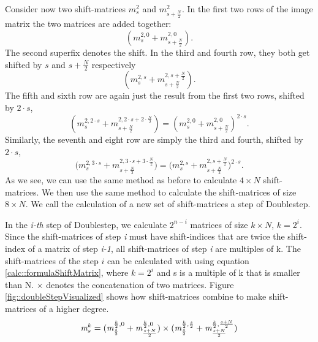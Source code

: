 \documentclass[12pt]{article}
\begin{document}
Consider now two shift-matrices $m_s^2$ and $m_{s+\frac{N}{2}}^2$. In the first two rows of the image matrix the two matrices are added together:
\[
(m_s^{2,0}+m_{s+\frac{N}{2}}^{2,0}).
\] The second superfix denotes the shift. In the third and fourth row, they both get shifted by $s$ and $s+\frac{N}{2}$ respectively 
\[
(m_s^ {2,s}+m_{s+\frac{N}{2}}^{2, s+\frac{N}{2}}).
\]
The fifth and sixth row are again just the result from the first two rows, shifted by $2\cdot s$,
\[ 
(m_s^ {2,2\cdot s}+m_{s+\frac{N}{2}}^{2, 2\cdot s+2\cdot \frac{N}{2}})=(m_s^{2,0}+m_{s+\frac{N}{2}}^{2,0})^{2\cdot s}.
\]
Similarly, the seventh and eight row are simply the third and fourth, shifted by $2\cdot s$,
\[ \big(m_s^ {2,3\cdot s}+m_{s+\frac{N}{2}}^{2, 3\cdot s+3\cdot \frac{N}{2}}\big)=\big(m_s^{2,s}+m_{s+\frac{N}{2}}^{2,s+\frac{N}{2}}\big)^{2\cdot s}.
\]
As we see, we can use the same method as before to calculate $4\times N$ shift-matrices. We then use the same method to calculate the shift-matrices of size $8 \times N$. We call the calculation of a new set of shift-matrices a step of Doublestep.
 
In the \emph{i-th} step of Doublestep, we calculate $2^{n-i}$ matrices of size $k\times N$, $k=2^i$. Since the shift-matrices of step \emph{i} must have shift-indices that are twice the shift-index of a matrix of step \emph{i-1}, all shift-matrices of step \emph{i} are multiples of k. The shift-matrices of the step $i$ can be calculated with using equation \eqref{calc::formulaShiftMatrix}, where $k=2^i$ and s is a multiple of k that is smaller than N. $\times$ denotes the concatenation of two matrices.
Figure \ref{fig::doubleStepVisualized} shows how shift-matrices combine to make shift-matrices of a higher degree.\\

\begin{equation} [h]
\emph{m}_{s}^k=(\emph{m}_{\frac{s}{2}}^{\frac{k}{2},0}+\emph{m}_{\frac{s+N}{2}}^{\frac{k}{2},0})\times (\emph{m}_{\frac{s}{2}}^{\frac{k}{2},\frac{s}{2}}+\emph{m}_{\frac{s+N}{2}}^{\frac{k}{2},\frac{s+N}{2}})
\label{calc::formulaShiftMatrix}
\end{equation}
\end{document}
